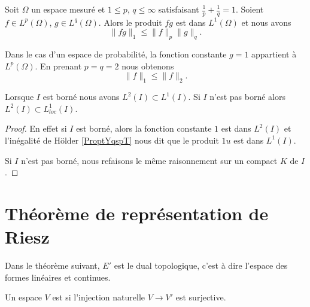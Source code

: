 \begin{proposition}       \label{ProptYqspT}
    Soit \( \Omega\) un espace mesuré et \( 1\leq p\), \( q\leq\infty\) satisfaisant \( \frac{1}{ p }+\frac{1}{ q }=1\). Soient \( f\in L^p(\Omega)\), \( g\in L^q(\Omega)\). Alors le produit \( fg\) est dans \( L^1(\Omega)\) et nous avons
    \begin{equation}
        \| fg \|_1\leq \| f \|_p\| g \|_q.
    \end{equation}
\end{proposition}

\begin{remark}      \label{RemNormuptNird}
    Dans le cas d'un espace de probabilité, la fonction constante \( g=1\) appartient à \( L^p(\Omega)\). En prenant \( p=q=2\) nous obtenons
    \begin{equation}
        \| f \|_1\leq\| f \|_2.
    \end{equation}
\end{remark}

\begin{lemma}   \label{LemTLHwYzD}
    Lorsque \( I\) est borné nous avons \( L^2(I)\subset L^1(I)\). Si \( I\) n'est pas borné alors \( L^2(I)\subset L^1_{loc}(I)\).
\end{lemma}

\begin{proof}
    En effet si \( I\) est borné, alors la fonction constante \( 1\) est dans \( L^2(I)\) et l'inégalité de Hölder \ref{ProptYqspT} nous dit que le produit \( 1u\) est dans \( L^1(I)\).

    Si \( I\) n'est pas borné, nous refaisons le même raisonnement sur un compact \( K\) de \( I\).
\end{proof}

\section{Théorème de représentation de Riesz}

Dans le théorème suivant, \( E'\) est le dual topologique, c'est à dire l'espace des formes linéaires et continues.
\begin{definition}
    Un espace \( V\) est  si l'injection naturelle \( V\to V'\) est surjective.
\end{definition}

